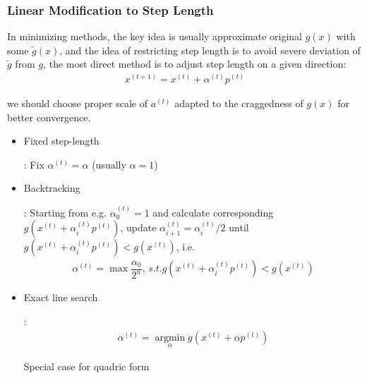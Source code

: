     \subsubsection{Linear Modification to Step Length}

    In minimizing methods, the key idea is usually approximate original $ g(x) $ with some $ \tilde{g}(x) $, and the idea of restricting step length is to avoid severe deviation of $ \tilde{g} $ from $ g $, the most direct method is to adjust step length on a given direction: 
    \begin{align}
        x^{(t+1)}=x^{(t)}+\alpha ^{(t)}p^{(t)}
    \end{align}
    
    we should choose proper scale of $ a^{(t)} $ adapted to the craggedness of $ g(x) $ for better convergence.
\begin{itemize}[topsep=2pt,itemsep=0pt]
    \item \hypertarget{FixedStepLength}{Fixed step-length}: Fix $ \alpha ^{(t)}=\alpha  $ (usually $ \alpha =1 $)    
    \item \hypertarget{Backtracking}{Backtracking}: Starting from e.g. $ \alpha^{(t)}_0 =1 $ and calculate corresponding $ g\left(x^{(t)}+\alpha ^{(t)}_ip^{(t)}\right) $, update $ \alpha ^{(t)}_{i+1}=\alpha ^{(t)}_i/2 $ until $ g\left(x^{(t)}+\alpha ^{(t)}_ip^{(t)}\right)<g\left(x^{(t)}\right) $, i.e.
    \begin{align}
        \alpha ^{(t)}=\max  \dfrac{\alpha _0}{2^n},\,s.t. g\left(x^{(t)}+\alpha ^{(t)}_ip^{(t)}\right)<g\left(x^{(t)}\right)
    \end{align}
    \item \hypertarget{ExactLineSearch}{Exact line search}: 
    \begin{align}
        \alpha ^{(t)}=\mathop{\arg\min}\limits_{\alpha } g\left( x^{(t)}+\alpha p^{(t)} \right)  
    \end{align}

    Special case for quadric form $  $






\end{itemize}
